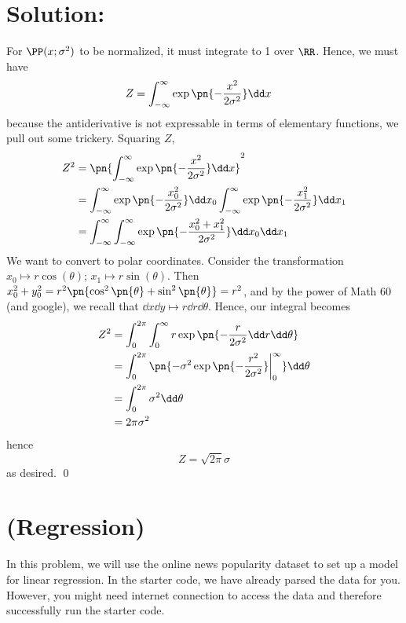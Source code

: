 \documentclass[189]{pset}
\begin{document}
  \section*{Solution:}
    For $\PP(x;\sigma^2)$ to be normalized, it must integrate to 1
    over $\RR$. Hence, we must have
    \begin{align*}
      Z
      &= \int_{-\infty}^\infty \exp\pn{-\frac{x^2}{2\sigma^2}}\dd x
    \end{align*}
    because the antiderivative is not expressable in terms of
    elementary functions, we pull out some trickery. Squaring $Z$,
    \begin{align*}
      Z^2
      &= \pn{\int_{-\infty}^\infty \exp\pn{-\frac{x^2}{2\sigma^2}}\dd
        x}^2 \\
      &= \int_{-\infty}^\infty \exp\pn{-\frac{x_0^2}{2\sigma^2}}\dd
        x_0 \int_{-\infty}^\infty \exp\pn{-\frac{x_1^2}{2\sigma^2}}\dd
        x_1 \\
      &= \int_{-\infty}^\infty \int_{-\infty}^\infty \exp\pn{-\frac{
        x_0^2 + x_1^2}{2\sigma^2}} \dd x_0 \dd x_1
    \end{align*}
    We want to convert to polar coordinates. Consider the
    transformation $x_0 \mapsto r\cos(\theta)$; $x_1 \mapsto
    r\sin(\theta)$. Then $x_0^2 + y_0^2 = r^2\pn{\cos^2\pn{\theta} +
      \sin^2\pn{\theta}} = r^2$, and by the power of Math 60 (and
    google), we recall that $\dd x \dd y \mapsto r \dd r \dd \theta$.
    Hence, our integral becomes
    \begin{align*}
      Z^2
      &= \int_0^{2\pi} \int_0^\infty r\exp\pn{-\frac{r}{2\sigma^2} \dd
        r \dd \theta} \\
      &= \int_0^{2\pi} \pn{-\sigma^2 \exp\pn{-\frac{r^2}{2\sigma^2}}
        \bigg\vert_0^\infty } \dd \theta \\
      &= \int_0^{2\pi} \sigma^2 \dd \theta \\
      &= 2\pi \sigma^2
    \end{align*}
    hence
    \[
      \boxed{Z = \sqrt{2\pi}\sigma}
    \]
    as desired. \qed

  \clearpage


  \section{(Regression)}
    In this problem, we will use the online news popularity dataset to
    set up a model for linear regression. In the starter code, we have
    already parsed the data for you. However, you might need internet
    connection to access the data and therefore successfully run the
    starter code.
\end{document}
